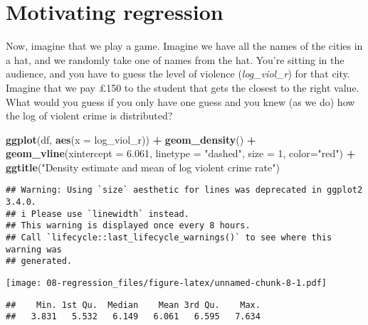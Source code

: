 \documentclass[
]{book}
\newenvironment{Shaded}{\begin{snugshade}}{\end{snugshade}}
\newcommand{\AttributeTok}[1]{\textcolor[rgb]{0.13,0.29,0.53}{#1}}
\newcommand{\DecValTok}[1]{\textcolor[rgb]{0.00,0.00,0.81}{#1}}
\newcommand{\FloatTok}[1]{\textcolor[rgb]{0.00,0.00,0.81}{#1}}
\newcommand{\FunctionTok}[1]{\textcolor[rgb]{0.13,0.29,0.53}{\textbf{#1}}}
\newcommand{\NormalTok}[1]{#1}
\newcommand{\SpecialCharTok}[1]{\textcolor[rgb]{0.81,0.36,0.00}{\textbf{#1}}}
\newcommand{\StringTok}[1]{\textcolor[rgb]{0.31,0.60,0.02}{#1}}
\begin{document}
\section{Motivating regression}\label{motivating-regression}

Now, imagine that we play a game. Imagine we have all the names of the cities in a hat, and we randomly take one of names from the hat. You're sitting in the audience, and you have to guess the level of violence (\emph{log\_viol\_r}) for that city. Imagine that we pay £150 to the student that gets the closest to the right value. What would you guess if you only have one guess and you knew (as we do) how the log of violent crime is distributed?

\begin{Shaded}
\begin{Highlighting}[]
\FunctionTok{ggplot}\NormalTok{(df, }\FunctionTok{aes}\NormalTok{(}\AttributeTok{x =}\NormalTok{ log\_viol\_r)) }\SpecialCharTok{+} 
  \FunctionTok{geom\_density}\NormalTok{() }\SpecialCharTok{+}
  \FunctionTok{geom\_vline}\NormalTok{(}\AttributeTok{xintercept =} \FloatTok{6.061}\NormalTok{, }\AttributeTok{linetype =} \StringTok{"dashed"}\NormalTok{, }\AttributeTok{size =} \DecValTok{1}\NormalTok{, }\AttributeTok{color=}\StringTok{"red"}\NormalTok{) }\SpecialCharTok{+}
  \FunctionTok{ggtitle}\NormalTok{(}\StringTok{"Density estimate and mean of log violent crime rate"}\NormalTok{)}
\end{Highlighting}
\end{Shaded}

\begin{verbatim}
## Warning: Using `size` aesthetic for lines was deprecated in ggplot2 3.4.0.
## i Please use `linewidth` instead.
## This warning is displayed once every 8 hours.
## Call `lifecycle::last_lifecycle_warnings()` to see where this warning was
## generated.
\end{verbatim}

\texttt{[image: 08-regression\_files/figure-latex/unnamed-chunk-8-1.pdf]}

\begin{Shaded}
\end{Shaded}

\begin{verbatim}
##    Min. 1st Qu.  Median    Mean 3rd Qu.    Max. 
##   3.831   5.532   6.149   6.061   6.595   7.634
\end{verbatim}
\end{document}
